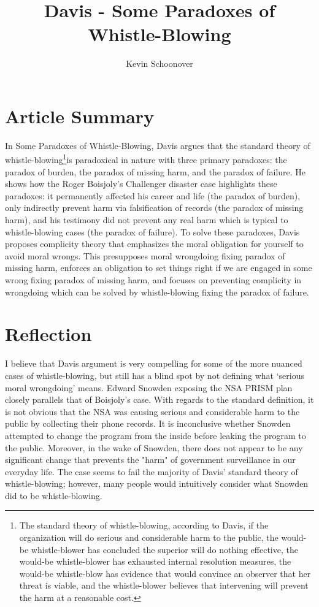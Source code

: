 \documentclass[12pt]{article}
\begin{document}
\title{Davis - Some Paradoxes of Whistle-Blowing}
\author{Kevin Schoonover}

\maketitle

\section{Article Summary}
In Some Paradoxes of Whistle-Blowing, Davis argues that the standard theory of
whistle-blowing\footnote{The standard theory of whistle-blowing, according to
Davis, if the organization will do serious and considerable harm to the public,
the would-be whistle-blower has concluded the superior will do nothing
effective, the would-be whistle-blower has exhausted internal resolution
measures, the would-be whistle-blow has evidence that would convince an observer
that her threat is viable, and the whistle-blower believes that intervening will
prevent the harm at a reasonable cost.}is paradoxical in nature with three
primary paradoxes: the paradox of burden, the paradox of missing harm, and the
paradox of failure.  He shows how the Roger Boisjoly's Challenger disaster case
highlights these paradoxes: it permanently affected his career and life (the
paradox of burden), only indirectly prevent harm via falsification of records
(the paradox of missing harm), and his testimony did not prevent any real harm
which is typical to whistle-blowing cases (the paradox of failure). To solve
these paradoxes, Davis proposes complicity theory that emphasizes the moral
obligation for yourself to avoid moral wrongs. This presupposes moral wrongdoing
fixing paradox of missing harm, enforces an obligation to set things right if we
are engaged in some wrong fixing paradox of missing harm, and focuses on
preventing complicity in wrongdoing which can be solved by whistle-blowing
fixing the paradox of failure.

\section{Reflection}
I believe that Davis argument is very compelling for some of the more nuanced
cases of whistle-blowing, but still has a blind spot by not defining what
`serious moral wrongdoing' means. Edward Snowden
exposing the NSA PRISM plan closely parallels that of Boisjoly's case. With
regards to the standard definition, it is not obvious that the NSA was causing
serious and considerable harm to the public by collecting their phone records.
It is inconclusive whether Snowden attempted to change the program from the inside
before leaking the program to the public.  Moreover, in the wake of Snowden,
there does not appear to be any significant change that prevents the "harm" of
government surveillance in our everyday life.  The case seems to fail the
majority of Davis' standard theory of whistle-blowing; however, many people would
intuitively consider what Snowden did to be whistle-blowing. 
\end{document}
